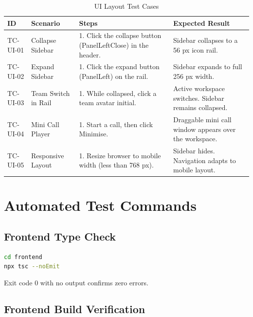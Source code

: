 \documentclass[11pt,a4paper]{report}
\begin{document}
\begin{xltabular}{\textwidth}{|L{2.5cm}|L{2.5cm}|X|L{3.5cm}|}
\caption{UI Layout Test Cases} \\
\hline
{} \textbf{ID} & \textbf{Scenario} & \textbf{Steps} & \textbf{Expected Result} \\ \hline
\endhead

TC-UI-01 & Collapse Sidebar &
1. Click the collapse button (PanelLeftClose) in the header. &
Sidebar collapses to a 56 px icon rail. \\ \hline

TC-UI-02 & Expand Sidebar &
1. Click the expand button (PanelLeft) on the rail. &
Sidebar expands to full 256 px width. \\ \hline

TC-UI-03 & Team Switch in Rail &
1. While collapsed, click a team avatar initial. &
Active workspace switches. Sidebar remains collapsed. \\ \hline

TC-UI-04 & Mini Call Player &
1. Start a call, then click Minimise. &
Draggable mini call window appears over the workspace. \\ \hline

TC-UI-05 & Responsive Layout &
1. Resize browser to mobile width (less than 768 px). &
Sidebar hides. Navigation adapts to mobile layout. \\ \hline
\end{xltabular}

\chapter{Automated Test Commands}

\section{Frontend Type Check}

\begin{lstlisting}[language=bash, caption=TypeScript static analysis]
cd frontend
npx tsc --noEmit
\end{lstlisting}

Exit code 0 with no output confirms zero errors.

\section{Frontend Build Verification}
\end{document}

